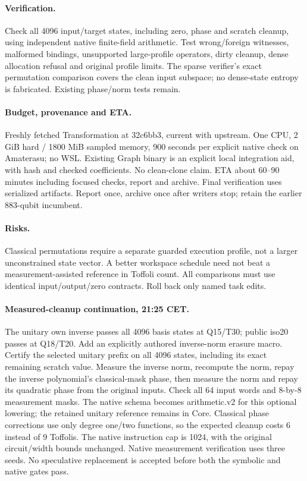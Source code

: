 \documentclass{article}
\begin{document}
\paragraph{Verification.} Check all 4096 input/target states, including zero,
phase and scratch cleanup, using independent native finite-field arithmetic.
Test wrong/foreign witnesses, malformed bindings, unsupported large-profile
operators, dirty cleanup, dense allocation refusal and original profile limits.
The sparse verifier's exact permutation comparison covers the clean input
subspace; no dense-state entropy is fabricated. Existing phase/norm tests remain.
\paragraph{Budget, provenance and ETA.} Freshly fetched Transformation at
32c6bb3, current with upstream. One CPU, 2 GiB hard / 1800 MiB sampled memory,
900 seconds per explicit native check on Amaterasu; no WSL. Existing Graph
binary is an explicit local integration aid, with hash and checked coefficients.
No clean-clone claim. ETA about 60--90 minutes including focused checks, report
and archive. Final verification uses serialized artifacts. Report once, archive
once after writers stop; retain the earlier 883-qubit incumbent.
\paragraph{Risks.} Classical permutations require a separate guarded execution
profile, not a larger unconstrained state vector. A better workspace schedule
need not beat a measurement-assisted reference in Toffoli count. All comparisons
must use identical input/output/zero contracts. Roll back only named task edits.
\paragraph{Measured-cleanup continuation, 21:25 CET.} The unitary own inverse
passes all 4096 basis states at Q15/T30; public iso20 passes at Q18/T20.
Add an explicitly authored inverse-norm erasure macro. Certify the selected
unitary prefix on all 4096 states, including its exact remaining scratch value.
Measure the inverse norm, recompute the norm, repay the inverse polynomial's
classical-mask phase, then measure the norm and repay its quadratic phase from
the original inputs. Check all 64 input words and 8-by-8 measurement masks.
The native schema becomes arithmetic.v2 for this optional lowering; the retained
unitary reference remains in Core. Classical phase corrections use only degree
one/two functions, so the expected cleanup costs 6 instead of 9 Toffolis.
The native instruction cap is 1024, with the original circuit/width bounds
unchanged. Native measurement verification uses three seeds. No speculative
replacement is accepted before both the symbolic and native gates pass.
\end{document}
